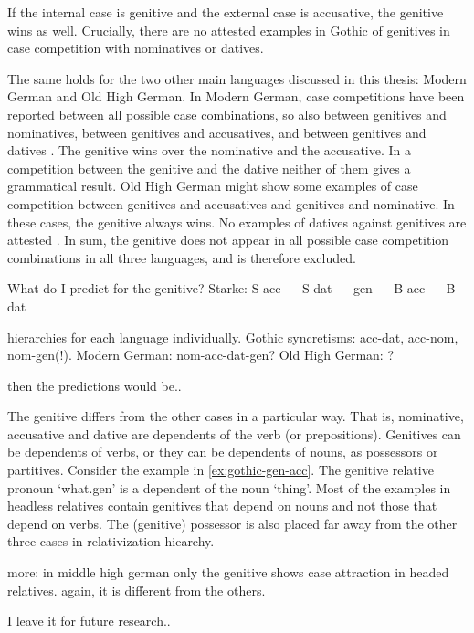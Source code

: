 If the internal case is genitive and the external case is accusative, the genitive wins as well. Crucially, there are no attested examples in Gothic of genitives in case competition with nominatives or datives.

The same holds for the two other main languages discussed in this thesis: Modern German and Old High German.
In Modern German, case competitions have been reported between all possible case combinations, so also between genitives and nominatives, between genitives and accusatives, and between genitives and datives \citep[cf.][]{vogel2001}. The genitive wins over the nominative and the accusative. In a competition between the genitive and the dative neither of them gives a grammatical result.
Old High German might show some examples of case competition between genitives and accusatives and genitives and nominative. In these cases, the genitive always wins. No examples of datives against genitives are attested \citep{behaghel1923}.
In sum, the genitive does not appear in all possible case competition combinations in all three languages, and is therefore excluded.

What do I predict for the genitive? Starke: S-acc --- S-dat --- gen --- B-acc --- B-dat

hierarchies for each language individually. Gothic syncretisms: acc-dat, acc-nom, nom-gen(!). Modern German: nom-acc-dat-gen? Old High German: ?

then the predictions would be..

The genitive differs from the other cases in a particular way. That is, nominative, accusative and dative are dependents of the verb (or prepositions). Genitives can be dependents of verbs, or they can be dependents of nouns, as possessors or partitives. Consider the example in \ref{ex:gothic-gen-acc}. The genitive relative pronoun  `what.\ac{gen}' is a dependent of the noun  `thing'. Most of the examples in headless relatives contain genitives that depend on nouns and not those that depend on verbs. The (genitive) possessor is also placed far away from the other three cases in  relativization hiearchy.

more: in middle high german only the genitive shows case attraction in headed relatives. again, it is different from the others.

I leave it for future research..
